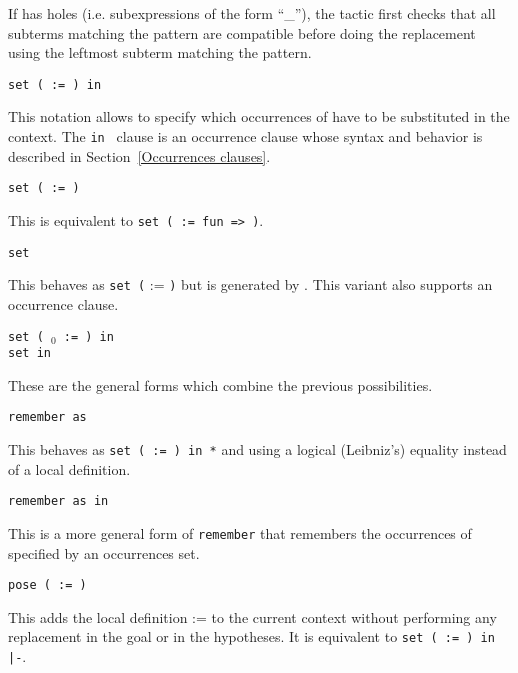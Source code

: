 \begin{coq_example*}
If {\term} has holes (i.e. subexpressions of the form ``\_''), the
tactic first checks that all subterms matching the pattern are
compatible before doing the replacement using the leftmost subterm
matching the pattern.

\begin{Variants}

\item {\tt set ( {\ident} := {\term} ) in {\occgoalset}}

This notation allows to specify which occurrences of {\term} have to
be substituted in the context. The {\tt in {\occgoalset}} clause is an
occurrence clause whose syntax and behavior is described in
Section~\ref{Occurrences clauses}.

\item {\tt set ( {\ident} \nelist{\binder}{} := {\term} )}

  This is equivalent to {\tt set ( {\ident} := fun
  \nelist{\binder}{} => {\term} )}.

\item {\tt set \term}

  This behaves as {\tt set (} {\ident} := {\term} {\tt )} but {\ident}
  is generated by {\Coq}. This variant also supports an occurrence clause.

\item {\tt set ( {\ident$_0$} \nelist{\binder}{} := {\term} ) in {\occgoalset}}\\
      {\tt set {\term} in {\occgoalset}}

  These are the general forms which combine the previous possibilities.

\item {\tt remember {\term} as {\ident}}

  This behaves as {\tt set ( {\ident} := {\term} ) in *} and using a
  logical (Leibniz's) equality instead of a local definition.

\item {\tt remember {\term} as {\ident} in {\occgoalset}}

  This is a more general form of {\tt remember} that remembers the
  occurrences of {\term} specified by an occurrences set.

\item {\tt pose ( {\ident} := {\term} )}

  This adds the local definition {\ident} := {\term} to the current
  context without performing any replacement in the goal or in the
  hypotheses. It is equivalent to {\tt set ( {\ident} {\tt :=}
  {\term} {\tt ) in |-}}.


\end{Variants}
\end{coq_example*}
